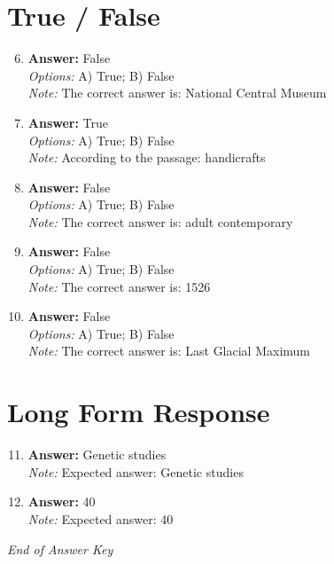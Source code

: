 \documentclass[12pt]{article}
\begin{document}
\section*{True / False}
\begin{enumerate}[label=\arabic*.]
\setcounter{enumi}{5}
\item \textbf{Answer:} False
\\ \textit{Options:} A) True; B) False
\\ \textit{Note:} The correct answer is: National Central Museum
\item \textbf{Answer:} True
\\ \textit{Options:} A) True; B) False
\\ \textit{Note:} According to the passage: handicrafts
\item \textbf{Answer:} False
\\ \textit{Options:} A) True; B) False
\\ \textit{Note:} The correct answer is: adult contemporary
\item \textbf{Answer:} False
\\ \textit{Options:} A) True; B) False
\\ \textit{Note:} The correct answer is: 1526
\item \textbf{Answer:} False
\\ \textit{Options:} A) True; B) False
\\ \textit{Note:} The correct answer is: Last Glacial Maximum
\end{enumerate}

\section*{Long Form Response}
\begin{enumerate}[label=\arabic*.]
\setcounter{enumi}{10}
\item \textbf{Answer:} Genetic studies
\\ \textit{Note:} Expected answer: Genetic studies
\item \textbf{Answer:} 40
\\ \textit{Note:} Expected answer: 40
\end{enumerate}

\vfill
\noindent\textit{End of Answer Key}
\end{document}

